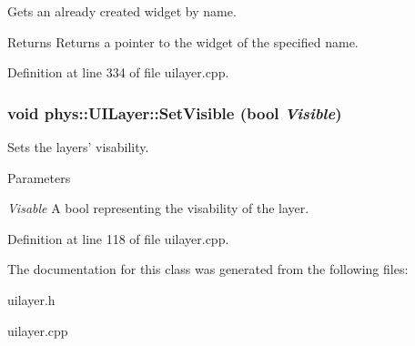 Gets an already created widget by name. 

\begin{DoxyReturn}{Returns}
Returns a pointer to the widget of the specified name. 
\end{DoxyReturn}


Definition at line 334 of file uilayer.cpp.

\hypertarget{classphys_1_1UILayer_a466e35a0362e5f8f47c35e646075432c}{
\subsubsection[{SetVisible}]{\setlength{\rightskip}{0pt plus 5cm}void phys::UILayer::SetVisible (bool {\em Visible})}}
\label{da/d48/classphys_1_1UILayer_a466e35a0362e5f8f47c35e646075432c}


Sets the layers' visability. 


\begin{DoxyParams}{Parameters}
\item[{\em Visable}]A bool representing the visability of the layer. \end{DoxyParams}


Definition at line 118 of file uilayer.cpp.



The documentation for this class was generated from the following files:\begin{DoxyCompactItemize}
\item 
uilayer.h\item 
uilayer.cpp\end{DoxyCompactItemize}
